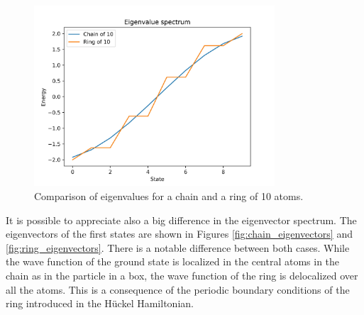 \documentclass{article}
\begin{document}
\begin{figure}[ht]
    \centering
    \includegraphics[width=0.8\textwidth]{Figures/chain_vs_ring.jpg}
    \caption{Comparison of eigenvalues for a chain and a ring of 10 atoms.}
    \label{fig:chain_ring}
\end{figure}

It is possible to appreciate also a big difference in the eigenvector spectrum. The eigenvectors of the first states are shown in Figures \ref{fig:chain_eigenvectors} and \ref{fig:ring_eigenvectors}. There is a notable difference between both cases. While the wave function of the ground state is localized in the central atoms in the chain as in the particle in a box, the wave function of the ring is delocalized over all the atoms. This is a consequence of the periodic boundary conditions of the ring introduced in the Hückel Hamiltonian.
\end{document}
